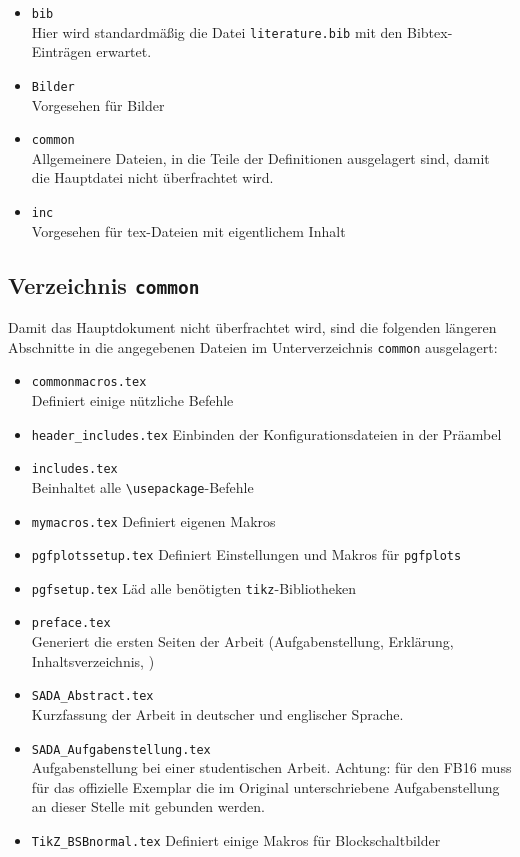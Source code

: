 \begin{itemize}
	\item \verb|bib|\\Hier wird standardmäßig die Datei \verb|literature.bib| mit den Bibtex-Einträgen erwartet.
	\item \verb|Bilder|\\Vorgesehen für Bilder
	\item \verb|common|\\Allgemeinere Dateien, in die Teile der Definitionen ausgelagert sind, damit die Hauptdatei nicht überfrachtet wird.
	\item \verb|inc|\\Vorgesehen für tex-Dateien mit eigentlichem Inhalt
\end{itemize}


\subsection{Verzeichnis \texttt{common}}
Damit das Hauptdokument nicht überfrachtet wird, sind die folgenden längeren \glqq{}Abschnitte\grqq{} in die angegebenen Dateien im Unterverzeichnis \verb|common| ausgelagert:
\begin{itemize}
	\item \verb|commonmacros.tex|\\
		Definiert einige nützliche Befehle
	\item \verb|header_includes.tex|
		Einbinden der Konfigurationsdateien in der Präambel
	\item \verb|includes.tex|\\
		Beinhaltet alle \verb|\usepackage|-Befehle
	\item \verb|mymacros.tex|
		Definiert eigenen Makros
	\item \verb|pgfplotssetup.tex|
		Definiert Einstellungen und Makros für \texttt{pgfplots}
	\item \verb|pgfsetup.tex|
		Läd alle benötigten \texttt{tikz}-Bibliotheken
	\item \verb|preface.tex|\\
		Generiert die ersten Seiten der Arbeit (Aufgabenstellung, Erklärung, Inhaltsverzeichnis, \etc)
	\item \verb|SADA_Abstract.tex|\\
		Kurzfassung der Arbeit in deutscher und englischer Sprache.
	\item \verb|SADA_Aufgabenstellung.tex|\\
		Aufgabenstellung bei einer studentischen Arbeit. Achtung: für den FB16 muss für das offizielle Exemplar die im Original unterschriebene Aufgabenstellung an dieser Stelle mit gebunden werden.
	\item \verb|TikZ_BSBnormal.tex|
		Definiert einige Makros für Blockschaltbilder
\end{itemize}



